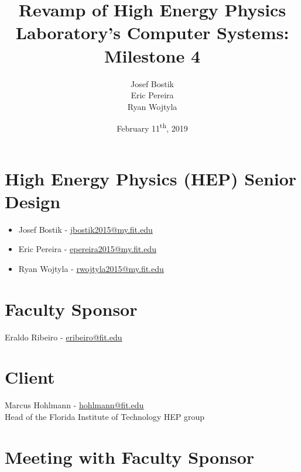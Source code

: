 \documentclass[12pt]{article}
\newcommand\tab[1][1cm]{\hspace*{#1}}
\begin{document}
	

\begin{titlepage}
	
\author{Josef Bostik\\
	Eric Pereira\\
	Ryan Wojtyla\\}
\date{February 11\textsuperscript{th}, 2019}
\title{Revamp of High Energy Physics Laboratory's Computer Systems: Milestone 4}

\maketitle

\end{titlepage}

\tableofcontents

\newpage {}

\section{High Energy Physics (HEP) Senior Design}

\begin{itemize}
	\item Josef Bostik - \href{mailto:jbostik2015@my.fit.edu}{jbostik2015@my.fit.edu}
	\item Eric Pereira - \href{mailto:epereira2015@my.fit.edu}{epereira2015@my.fit.edu }
	\item Ryan Wojtyla - \href{mailto:rwojtyla2015@my.fit.edu}{rwojtyla2015@my.fit.edu}
\end{itemize}

\section{Faculty Sponsor}

\tab Eraldo Ribeiro - \href{mailto:eribeiro@fit.edu}{eribeiro@fit.edu}

\section{Client}

\tab Marcus Hohlmann - \href{mailto:hohlmann@fit.edu}{hohlmann@fit.edu} \\ 
\tab Head of the Florida Institute of Technology HEP group

\section{Meeting with Faculty Sponsor}
\end{document}
